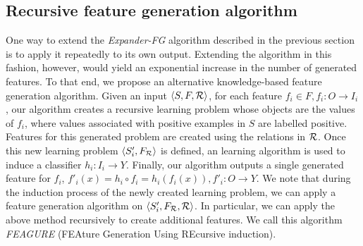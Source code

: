 \documentclass{article}
\theoremstyle{definition}
\begin{document}
\subsection{Recursive feature generation algorithm}
\label{algorithm_section}
One way to extend the \emph{Expander-FG} algorithm described in the previous section is to apply it repeatedly to its own output.
Extending the algorithm in this fashion, however, would yield an exponential increase in the number of generated features.
To that end, we propose an alternative knowledge-based feature generation algorithm. Given an input $\langle S,F,{\cal R} \rangle$, for each feature $f_i\in F, f_i:O\rightarrow I_i$, our algorithm creates a recursive learning problem whose objects are the values of $f_i$, where values associated with positive examples in $S$ are labelled positive. %
Features for this generated problem are created using the relations in ${\cal R}$. Once this new learning problem $\langle S'_i,F_{\cal R}\rangle$ is defined, an learning algorithm is used to induce a classifier $h_i:I_i\rightarrow Y$. Finally, our algorithm outputs a single generated feature for $f_i$, $f'_i(x)=h_i\circ f_i=h_i(f_i(x)), f'_i:O\rightarrow Y$.
We note that during the induction process of the newly created learning problem, we can apply a feature generation algorithm on $\langle S'_i,F_{\cal R},{\cal R} \rangle$. In particular, we can apply the above method recursively to create additional features. We call this algorithm \emph{FEAGURE} (FEAture Generation Using REcursive induction).

\end{document}
